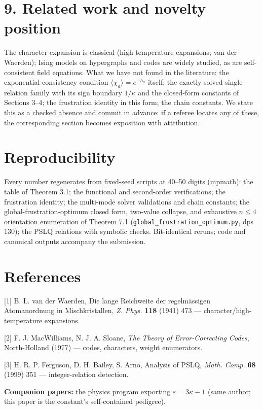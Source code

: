 \documentclass[11pt]{article}
\begin{document}
\section*{9. Related work and novelty position}
The character expansion is classical (high-temperature expansions; van der Waerden); Ising models on hypergraphs and codes are widely studied, as are self-consistent field equations.  What we have not found in the literature: the exponential-consistency condition $\langle\chi_a\rangle = e^{-h_a}$ itself; the exactly solved single-relation family with its sign boundary $1/\kappa$ and the closed-form constants of Sections 3–4; the frustration identity in this form; the chain constants.  We state this as a checked absence and commit in advance: if a referee locates any of these, the corresponding section becomes exposition with attribution.

\section*{Reproducibility}
Every number regenerates from fixed-seed scripts at 40–50 digits (mpmath): the table of Theorem 3.1; the functional and second-order verifications; the frustration identity; the multi-mode solver validations and chain constants; the global-frustration-optimum closed form, two-value collapse, and exhaustive $n\le4$ orientation enumeration of Theorem 7.1 (\texttt{global\_frustration\_optimum.py}, dps 130); the PSLQ relations with symbolic checks.  Bit-identical reruns; code and canonical outputs accompany the submission.

\section*{References}
[1] B. L. van der Waerden, Die lange Reichweite der regelmässigen Atomanordnung in Mischkristallen, \emph{Z. Phys.} \textbf{118} (1941) 473 — character/high-temperature expansions.

[2] F. J. MacWilliams, N. J. A. Sloane, \emph{The Theory of Error-Correcting Codes}, North-Holland (1977) — codes, characters, weight enumerators.

[3] H. R. P. Ferguson, D. H. Bailey, S. Arno, Analysis of PSLQ, \emph{Math. Comp.} \textbf{68} (1999) 351 — integer-relation detection.

\textbf{Companion papers:} the physics program exporting $\varepsilon = 3\kappa - 1$ (same author; this paper is the constant's self-contained pedigree).
\end{document}
